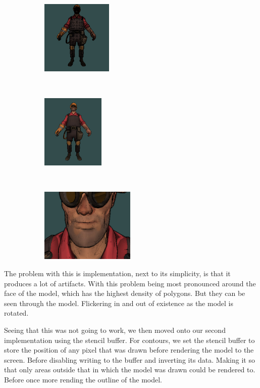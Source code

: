 \begin{figure}[h]
\centering
    \begin{subfigure}[b]{0.3\textwidth}
    \centering
    \includegraphics[height=100pt]{img/ModelA.png}
    \caption{}
    \label{fig-1}
\end{subfigure}
~
    \begin{subfigure}[b]{0.3\textwidth}
    \centering
	\includegraphics[height=100pt]{img/ModelB.png}
    \caption{}
    \label{fig-2}
\end{subfigure}
~
    \begin{subfigure}[b]{0.3\textwidth}
    \centering
    \includegraphics[height=100pt]{img/ModelC.png}
    \caption{}
    \label{fig-3}
\end{subfigure}
\end{figure}

The problem with this is implementation, next to its simplicity, is that it produces a lot of artifacts. 
With this problem being most pronounced around the face of the model, which has the highest density of polygons. 
But they can be seen through the model. Flickering in and out of existence as the model is rotated.

Seeing that this was not going to work, we then moved onto our second implementation using the stencil buffer. 
For contours, we set the stencil buffer to store the position of any pixel that was drawn before rendering the 
model to the screen. Before disabling writing to the buffer and inverting its data. Making it so that only areas 
outside that in which the model was drawn could be rendered to. Before once more rending the outline of the model.

